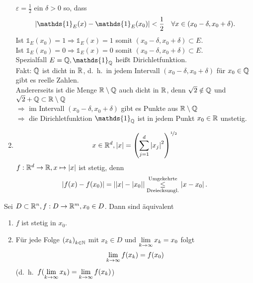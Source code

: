 \documentclass[../ana1.tex]{subfiles}
\begin{document}
\begin{bspe}
\begin{enumerate}
        \( \varepsilon = \frac{1}{2} \) ein \(\delta > 0\) so, dass
        \[ \abs{ \mathds{1}_E(x) - \mathds{1}_E(x_0) } < \frac{1}{2} 
        \quad \forall x\in (x_0 - \delta, x_0 + \delta) . \]
        Ist \( \mathds{1}_E(x_0) = 1 \Rightarrow \mathds{1}_E(x) = 1 \)
        somit \( (x_0 - \delta, x_0 + \delta) \subset E \).\\
        Ist \( \mathds{1}_E(x_0) = 0 \Rightarrow \mathds{1}_E(x) = 0 \)
        somit \( (x_0 - \delta, x_0 + \delta) \subset E \).\\
        Spezialfall \( E = \Q, \mathds{1}_\Q \) heißt Dirichletfunktion.\\
        Fakt: \( \mathbb{Q} \) ist dicht in \( \mathbb{R} \), d.\ h.\ in jedem Intervall
        \( (x_0 - \delta, x_0 + \delta) \) für \( x_0 \in\mathbb{Q} \) gibt es
        reelle Zahlen.\\
        Andererseits ist die Menge \( \mathbb{R}\setminus\mathbb{Q} \) auch dicht in \(\mathbb{R} \), 
        denn \( \sqrt{2} \notin \mathbb{Q} \) und \( \sqrt{2}+\mathbb{Q} \subset \mathbb{R}\setminus\mathbb{Q} \) \\
        \( \Rightarrow \) im Intervall \( (x_0 - \delta, x_0 + \delta) \)
        gibt es Punkte aus \( \mathbb{R}\setminus\mathbb{Q} \) \\
        \( \Rightarrow \) die Dirichletfunktion \( \mathds{1}_\Q \) ist
        in jedem Punkt \( x_0 \in\mathbb{R} \) unstetig. 
        \item \[ x\in \mathbb{R}^d, \left|x\right| = 
        {\left( \sum_{j=1}^d \left|x_j\right|^2 \right)}^{\nicefrac{1}{2}} \]
        \( f:\mathbb{R}^d \rightarrow \mathbb{R}, x\mapsto \left|x\right| \) ist stetig, denn
        \[ \left| f(x) - f(x_0) \right| = \left| \left|x\right| - \left|x_0\right| \right| 
        \overset{\text{Umgekehrte}}{\underset{\text{Dreiecksungl.}}{\leq}} \left|x - x_0\right|. \]
    \end{enumerate}
\end{bspe}
\begin{satz}
    Sei \( D\subset \mathbb{R}^n, f:D\rightarrow \mathbb{R}^m, x_0 \in D \). Dann sind
    äquivalent
    \begin{enumerate}
        \item \( f \) ist stetig in \( x_0 \).
        \item Für jede Folge \( {(x_k)}_{k\in\mathbb{N}} \) mit \( x_k \in D \)
        und \( \lim\limits_{k\rightarrow\infty} x_k = x_0 \) folgt 
        \[ \lim\limits_{k\rightarrow\infty} f(x_k) = f(x_0) \]
        (d.\ h.\  \( f(\lim\limits_{k\rightarrow\infty} x_k) = \lim\limits_{k\rightarrow\infty} f(x_k) \))
    \end{enumerate}
\end{satz}
\end{document}
